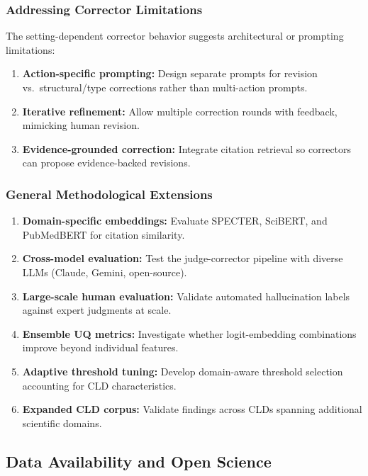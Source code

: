 \subsubsection{Addressing Corrector Limitations}

The setting-dependent corrector behavior suggests architectural or prompting limitations:
\begin{enumerate}[noitemsep]
    \item \textbf{Action-specific prompting:} Design separate prompts for revision vs.\ structural/type corrections rather than multi-action prompts.
    \item \textbf{Iterative refinement:} Allow multiple correction rounds with feedback, mimicking human revision.
    \item \textbf{Evidence-grounded correction:} Integrate citation retrieval so correctors can propose evidence-backed revisions.
\end{enumerate}

\subsubsection{General Methodological Extensions}

\begin{enumerate}[noitemsep]
    \item \textbf{Domain-specific embeddings:} Evaluate SPECTER, SciBERT, and PubMedBERT for citation similarity.
    \item \textbf{Cross-model evaluation:} Test the judge-corrector pipeline with diverse LLMs (Claude, Gemini, open-source).
    \item \textbf{Large-scale human evaluation:} Validate automated hallucination labels against expert judgments at scale.
    \item \textbf{Ensemble UQ metrics:} Investigate whether logit-embedding combinations improve beyond individual features.
    \item \textbf{Adaptive threshold tuning:} Develop domain-aware threshold selection accounting for CLD characteristics.
    \item \textbf{Expanded CLD corpus:} Validate findings across CLDs spanning additional scientific domains.
\end{enumerate}

\subsection{Data Availability and Open Science}
\label{sec:discussion_data}

